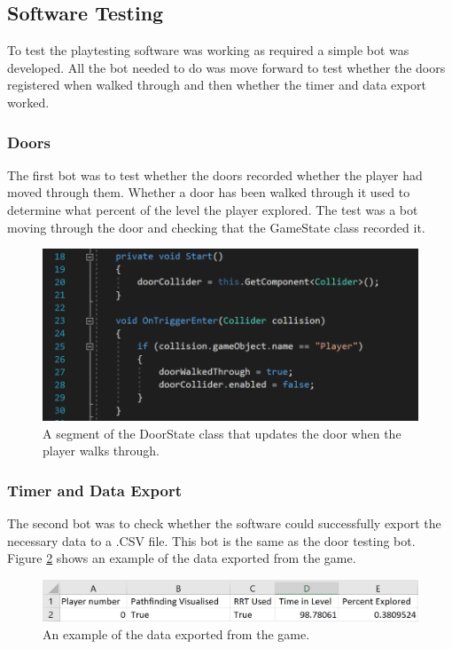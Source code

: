 \documentclass[journal]{IEEEtran}
\begin{document}
	\subsection{Software Testing} \label{softtest}
	To test the playtesting software was working as required a simple bot was developed. All the bot needed to do was move forward to test whether the doors registered when walked through and then whether the timer and data export worked.
	
	\subsubsection{Doors}
	The first bot was to test whether the doors recorded whether the player had moved through them. Whether a door has been walked through it used to determine what percent of the level the player explored.
	The test was a bot moving through the door and checking that the GameState class recorded it.
	
	
	\begin{figure}[h]
		\includegraphics[width=1.0\linewidth]{DoorCode.png}
		\caption{A segment of the DoorState class that updates the door when the player walks through.}
		\label{image:DoorCode}
	\end{figure} 
	
	\subsubsection{Timer and Data Export}
	The second bot was to check whether the software could successfully export the necessary data to a .CSV file. This bot is the same as the door testing bot. Figure \ref{image:ExportData} shows an example of the data exported from the game.  
	
	\begin{figure}[h]
		\includegraphics[width=1.0\linewidth]{ExportData.png}
		\caption{An example of the data exported from the game.}
		\label{image:ExportData}
	\end{figure} 
	
\end{document}
